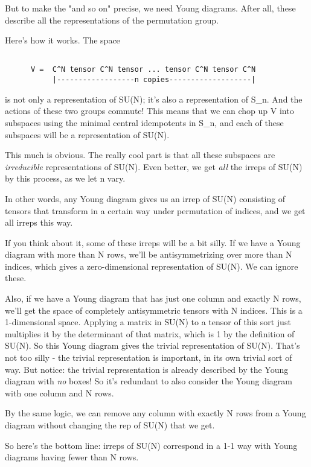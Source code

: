 But to make the "and so on" precise, we need Young diagrams.  After all,
these describe all the representations of the permutation group.  

Here's how it works.  The space 


\begin{verbatim}

      V =  C^N tensor C^N tensor ... tensor C^N tensor C^N
           |------------------n copies-------------------|

\end{verbatim}
    
is not only a representation of SU(N); it's also a representation of
S_{n}.  And the actions of these two groups commute!  This means that
we can chop up V into subspaces using the minimal central idempotents
in S_{n}, and each of these subspaces will be a representation of SU(N).

This much is obvious.  The really cool part is that all these subspaces
are \emph{irreducible} representations of SU(N).  Even better, we get 
\emph{all} the irreps of SU(N) by this process, as we let n vary.

In other words, any Young diagram gives us an irrep of SU(N) consisting
of tensors that transform in a certain way under permutation of indices,
and we get all irreps this way.  

If you think about it, some of these irreps will be a bit silly.  If we
have a Young diagram with more than N rows, we'll be antisymmetrizing
over more than N indices, which gives a zero-dimensional representation
of SU(N).  We can ignore these.  

Also, if we have a Young diagram that has just one column and exactly N
rows, we'll get the space of completely antisymmetric tensors with N
indices.  This is a 1-dimensional space.  Applying a matrix in SU(N) to
a tensor of this sort just multiplies it by the determinant of that
matrix, which is 1 by the definition of SU(N).  So this Young diagram
gives the trivial representation of SU(N).  That's not too silly - the
trivial representation is important, in its own trivial sort of way.
But notice: the trivial representation is already described by the Young
diagram with \emph{no} boxes!  So it's redundant to also consider the Young
diagram with one column and N rows.

By the same logic, we can remove any column with exactly N rows from a 
Young diagram without changing the rep of SU(N) that we get.

So here's the bottom line: irreps of SU(N) correspond in a 1-1 way with
Young diagrams having fewer than N rows.  

